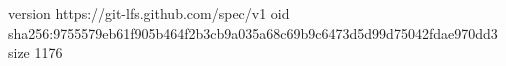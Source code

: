 version https://git-lfs.github.com/spec/v1
oid sha256:9755579eb61f905b464f2b3cb9a035a68c69b9c6473d5d99d75042fdae970dd3
size 1176
